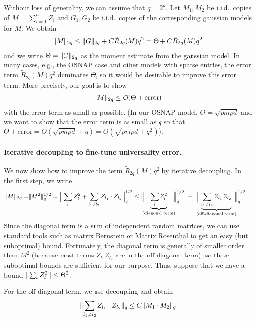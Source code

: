 \documentclass[11pt]{amsart}
\numberwithin{equation}{section}
\numberwithin{equation}{section}
\DeclarePairedDelimiter{\norm}{\lVert}{\rVert}
\begin{document}
Without loss of generality, we can assume that $q=2^k$. Let $M_1, M_2$ be i.i.d.\ copies of $M=\sum_{i=1}^nZ_{i}$ and $G_1,G_2$ be i.i.d.\ copies of the corresponding gaussian models for $M$. We obtain
\begin{align}
    \norm{M}_{2q} \le \norm{G}_{2q}+C\tilde{R}_{2q}(M)q^2=\Theta+C \tilde{R}_{2q}(M)q^2 \label{eq:initialunivgeneral}
\end{align}
and we write $\Theta=\norm{G}_{2q}$ as the moment estimate from the gaussian model. In many cases, e.g., the OSNAP case and other models with sparse entries, the error term $\tilde{R}_{2q}(M)q^2$ dominates $\Theta$, so it would be desirable to improve this error term. More precisely, our goal is to show 
\begin{align*}
    \norm{M}_{2q} \le O(\Theta+\text{error})
\end{align*}
with the error term as small as possible. (In our OSNAP model, $\Theta=\sqrt{pmpd}$ and we want to show that the error term is as small as $q$ so that $\Theta+\text{error}=O(\sqrt{pmpd}+q)=O(\sqrt{pmpd+q^2})$). 

\paragraph{\textbf{Iterative decoupling to fine-tune universality error.}}
We now show how to improve the term $\tilde{R}_{2q}(M)q^2$ by iterative decoupling. In the first step, we write
\begin{align*}
    \norm{M}_{2q}=&\norm{M^2}_q^{1/2}
    =\Big\|\sum_{l}Z_l^2+\sum_{l_1 \ne l_2}Z_{l_1} \cdot Z_{l_2}\Big\|_q^{1/2}
    \le
    {\Big\lVert \!\!\!\underbrace{\sum_{l} Z_l^{2}}_{(\text{diagonal term})} \!\!\!\Big\rVert_{q}^{1/2}}
\;+\;
    {\Big\lVert\!\!\! \underbrace{\sum_{l_1 \neq l_2} Z_{l_1}\,Z_{l_2} }_{(\text{off-diagonal term})}\!\!\!\Big\rVert_{q}^{1/2}}
\end{align*}
Since the diagonal term is a sum of independent random matrices, we can use standard tools such as matrix Bernstein or Matrix Rosenthal to get an easy (but suboptimal) bound. Fortunately, the diagonal term is generally of smaller order than $M^2$ (because most terms $Z_{l_1}Z_{l_2}$ are in the off-diagonal term), so these suboptimal bounds are sufficient for our purpose. Thus, suppose that we have a bound $ \norm{\sum_{l}Z_l^2} \le \Theta^2$.

For the off-diagonal term, we use decoupling and obtain
\begin{align*}
    \norm{\sum_{l_1 \ne l_2}Z_{l_1} \cdot Z_{l_2}}_q \le C\norm{M_1 \cdot M_2}_q
\end{align*}
\end{document}
